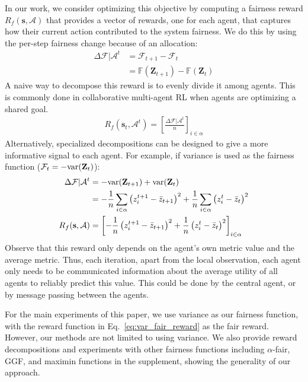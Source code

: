 In our work, we consider optimizing this objective by computing a fairness reward $R_f(\mathbf{s},\mathcal{A})$ that provides a vector of rewards, one for each agent, that captures how their current action contributed to the system fairness. We do this by using the per-step fairness change because of an allocation:
\begin{align}
    \Delta \mathcal{F}|\mathcal{A}^t 
    &= \mathcal{F}_{t+1} - \mathcal{F}_t \\
    &= \mathbb{F}(\textbf{Z}_{t+1}) - \mathbb{F}(\textbf{Z}_t) 
\end{align}
A naive way to decompose this reward is to evenly divide it among agents. This is commonly done in collaborative multi-agent RL when agents are optimizing a shared goal.
\begin{align}
    R_f(\mathbf{s}_t, \mathcal{A}^t) = \left[ \frac{\Delta \mathcal{F}|\mathcal{A}^t}{n} \right]_{i\in\alpha}
\end{align}
Alternatively, specialized decompositions can be designed to give a more informative signal to each agent. For example, if variance is used as the fairness function ($\mathcal{F}_t = -\text{var}(\textbf{Z}_t)$):
\begin{align}
    \Delta \mathcal{F}|\mathcal{A}^t 
    &= -\text{var}(\textbf{Z}_{t+1}) + \text{var}(\textbf{Z}_t) \\
    &= -\frac{1}{n}\sum_{i\in\alpha}\left( z^{t+1}_i - \bar{z}_{t+1} \right)^2 + \frac{1}{n}\sum_{i\in\alpha}\left( z^{t}_i - \bar{z}_{t} \right)^2 \\
    R_f(\mathbf{s}, \mathcal{A}) &= \left[ -\frac{1}{n} \left( z_i^{t+1} - \bar{z}_{t+1} \right)^2 + \frac{1}{n}\left( z_i^{t} - \bar{z}_{t} \right)^2  \right]_{i \in \alpha} \label{eq:var_fair_reward}
\end{align}
Observe that this reward only depends on the agent's own metric value and the average metric. Thus, each iteration, apart from the local observation, each agent only needs to be communicated information about the average utility of all agents to reliably predict this value. This could be done by the central agent, or by message passing between the agents. 

For the main experiments of this paper, we use variance as our fairness function, with the reward function in Eq.~\ref{eq:var_fair_reward} as the fair reward. However, our methods are not limited to using variance. We also provide reward decompositions and experiments with other fairness functions including $\alpha$-fair, GGF, and maximin functions in the supplement, showing the generality of our approach. 

